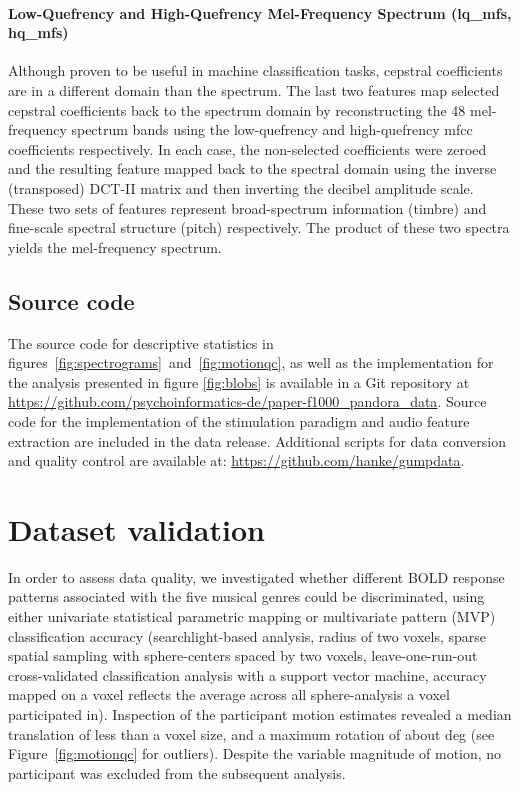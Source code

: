 \documentclass[10pt,a4paper,twocolumn]{article}
\begin{document}
\paragraph{Low-Quefrency and High-Quefrency Mel-Frequency Spectrum (lq\_mfs,
hq\_mfs)}
%
Although proven to be useful in machine classification tasks, cepstral
coefficients are in a different domain than the spectrum. The last two features
map selected cepstral coefficients back to the spectrum domain by
reconstructing the 48 mel-frequency spectrum bands using the low-quefrency and
high-quefrency mfcc coefficients respectively. In each case, the non-selected
coefficients were zeroed and the resulting feature mapped back to the spectral
domain using the inverse (transposed) DCT-II matrix and then inverting the
decibel amplitude scale. These two sets of features represent broad-spectrum
information (timbre) and fine-scale spectral structure (pitch) respectively.
The product of these two spectra yields the mel-frequency spectrum.


\subsection*{Source code}

The source code for descriptive statistics in
figures~\ref{fig:spectrograms}~and~\ref{fig:motionqc}, as well as the
implementation for the analysis presented in figure \ref{fig:blobs} is
available in a Git repository at
\url{https://github.com/psychoinformatics-de/paper-f1000_pandora_data}.  Source
code for the implementation of the stimulation paradigm and audio feature
extraction are included in the data release.  Additional scripts for data
conversion and quality control are available at:
\url{https://github.com/hanke/gumpdata}.

\section*{Dataset validation}


In order to assess data quality, we investigated whether different BOLD
response patterns associated with the five musical genres could be
discriminated, using either univariate statistical parametric mapping or
multivariate pattern (MVP) classification accuracy (searchlight-based analysis,
radius of two voxels, sparse spatial sampling with sphere-centers spaced by two
voxels, leave-one-run-out cross-validated classification analysis with a
support vector machine, accuracy mapped on a voxel reflects the average across
all sphere-analysis a voxel participated in).  Inspection of the participant
motion estimates revealed a median translation of less than a voxel size, and a
maximum rotation of about \unit[1]{deg} (see Figure~\ref{fig:motionqc} for
outliers). Despite the variable magnitude of motion, no participant was
excluded from the subsequent analysis.
\end{document}
